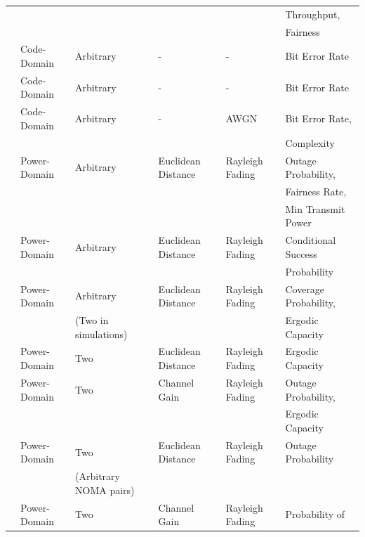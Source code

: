 \begin{table}[]
{\begin{tabular}{llllll}
															&								&										&											&													& Throughput, 					\\
															&								&										&											&													&	Fairness 							\\
\cite{nikopour2013sparse}			& Code-Domain		& Arbitrary  				& - 									& - 											& Bit Error Rate 				\\
\cite{mu2015fixed}						& Code-Domain		& Arbitrary 				& - 									& - 											& Bit Error Rate 				\\
\cite{du2016fast}							& Code-Domain		& Arbitrary  				& - 									& AWGN 										& Bit Error Rate, 			\\
															&								&										&											&													&	Complexity 						\\
\cite{cui2016novel}						& Power-Domain	& Arbitrary 				& Euclidean Distance 	& Rayleigh Fading 				& Outage Probability,		\\
															&								&										&											&													&	Fairness Rate, 				\\
															&								&										&											&													& Min Transmit Power 		\\
\cite{salehi2019meta}					& Power-Domain	& Arbitrary 				& Euclidean Distance 	& Rayleigh Fading 				& Conditional Success 	\\
															&								&										&											&													&	Probability 					\\
\cite{liu2018heterogeneous}		& Power-Domain	& Arbitrary 				& Euclidean Distance 	& Rayleigh Fading 				& Coverage Probability, \\
															&								&(Two in simulations) &										&													& Ergodic Capacity  		\\
\cite{kader2018coordinated}		& Power-Domain	& Two 							& Euclidean Distance 	& Rayleigh Fading 				& Ergodic Capacity 			\\
\cite{zhang2017downlink} 			& Power-Domain	& Two 							& Channel Gain 				& Rayleigh Fading 				& Outage Probability, 	\\
															&								&										&											&													& Ergodic Capacity 			\\
\cite{ding2016general}				& Power-Domain	& Two 							& Euclidean Distance 	& Rayleigh Fading 				& Outage Probability 		\\
															&								& (Arbitrary NOMA pairs) 	&								&													&												\\
\cite{ding2016impact}					& Power-Domain	& Two								& Channel Gain 				& Rayleigh Fading 				& Probability of 				\\

\end{tabular}}
\end{table}
